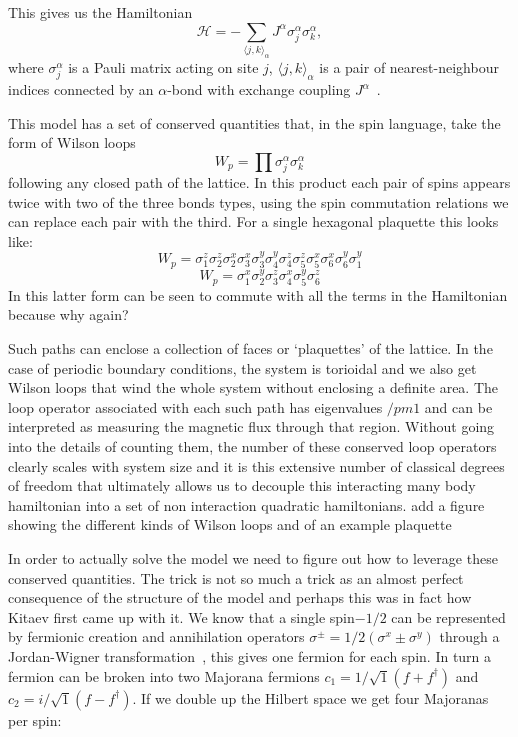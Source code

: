 This gives us the Hamiltonian
\begin{equation}
    \label{eqn:kitham}
    \mathcal{H} =  - \sum_{\langle j,k\rangle_\alpha} J^{\alpha}\sigma_j^{\alpha}\sigma_k^{\alpha},
\end{equation}
where $\sigma^\alpha_j$ is a Pauli matrix acting on site $j$, \(\langle j,k\rangle_\alpha\) is a pair of nearest-neighbour indices connected by an $\alpha$-bond with exchange coupling $J^\alpha$~\cite{kitaevAnyonsExactlySolved2006}.

This model has a set of conserved quantities that, in the spin language, take the form of Wilson loops 
\begin{equation}
W_p = \prod \sigma_j^{\alpha}\sigma_k^{\alpha}
\end{equation}
following any closed path of the lattice. In this product each pair of spins appears twice with two of the three bonds types, using the spin commutation relations we can replace each pair with the third. For a single hexagonal plaquette this looks like:
\begin{equation}
W_p = \sigma_1^{z}\sigma_2^{z} \sigma_2^{x}\sigma_3^{x} \sigma_3^{y}\sigma_4^{y} \sigma_4^{z}\sigma_5^{z} \sigma_5^{x}\sigma_6^{x} \sigma_6^{y}\sigma_1^{y}
\end{equation}
\begin{equation}
W_p = \sigma_1^{x}\sigma_2^{y} \sigma_3^{z} \sigma_4^{x} \sigma_5^{y}\sigma_6^{z}
\end{equation}
In this latter form can be seen to commute with all the terms in the Hamiltonian because {\color{red} why again?}

Such paths can enclose a collection of faces or `plaquettes' of the lattice. In the case of periodic boundary conditions, the system is torioidal and we also get Wilson loops that wind the whole system without enclosing a definite area. The loop operator associated with each such path has eigenvalues $/pm 1$ and can be interpreted as measuring the magnetic flux through that region. Without going into the details of counting them, the number of these conserved loop operators clearly scales with system size and it is this extensive number of classical degrees of freedom that ultimately allows us to decouple this interacting many body hamiltonian into a set of non interaction quadratic hamiltonians. {\color{red} add a figure showing the different kinds of Wilson loops and of an example plaquette}

In order to actually solve the model we need to figure out how to leverage these conserved quantities. The trick is not so much a trick as an almost perfect consequence of the structure of the model and perhaps this was in fact how Kitaev first came up with it. We know that a single spin$-1/2$ can be represented by fermionic creation and annihilation operators $\sigma^{\pm} = 1/2(\sigma^x \pm \sigma^y)$ through a Jordan-Wigner transformation~\cite{}, this gives one fermion for each spin. In turn a fermion can be broken into two Majorana fermions $c_1 = 1/\sqrt{1}(f + f^\dagger)$ and $c_2 = i/\sqrt{1}(f - f^\dagger)$. If we double up the Hilbert space we get four Majoranas per spin: 

